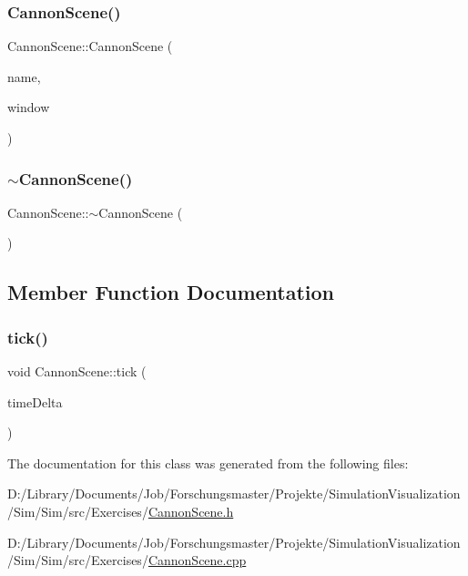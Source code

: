 \subsubsection{\texorpdfstring{Cannon\+Scene()}{CannonScene()}}
{\footnotesize\ttfamily Cannon\+Scene\+::\+Cannon\+Scene (\begin{DoxyParamCaption}\item[{const std\+::string \&}]{name,  }\item[{\mbox{\hyperlink{class_simulation_window}{Simulation\+Window}} $\ast$}]{window }\end{DoxyParamCaption})\hspace{0.3cm}{\ttfamily [explicit]}}

\mbox{\label{class_cannon_scene_af164426b8fb11e4910f53a2517fc9115}} 
\subsubsection{\texorpdfstring{$\sim$\+Cannon\+Scene()}{~CannonScene()}}
{\footnotesize\ttfamily Cannon\+Scene\+::$\sim$\+Cannon\+Scene (\begin{DoxyParamCaption}{ }\end{DoxyParamCaption})\hspace{0.3cm}{\ttfamily [default]}}



\subsection{Member Function Documentation}
\mbox{\label{class_cannon_scene_a2da031c5f2d38611f07985c6cbc91869}} 
\subsubsection{\texorpdfstring{tick()}{tick()}}
{\footnotesize\ttfamily void Cannon\+Scene\+::tick (\begin{DoxyParamCaption}\item[{float}]{time\+Delta }\end{DoxyParamCaption})\hspace{0.3cm}{\ttfamily [override]}}



The documentation for this class was generated from the following files\+:\begin{DoxyCompactItemize}
\item 
D\+:/\+Library/\+Documents/\+Job/\+Forschungsmaster/\+Projekte/\+Simulation\+Visualization/\+Sim/\+Sim/src/\+Exercises/\mbox{\hyperlink{_cannon_scene_8h}{Cannon\+Scene.\+h}}\item 
D\+:/\+Library/\+Documents/\+Job/\+Forschungsmaster/\+Projekte/\+Simulation\+Visualization/\+Sim/\+Sim/src/\+Exercises/\mbox{\hyperlink{_cannon_scene_8cpp}{Cannon\+Scene.\+cpp}}\end{DoxyCompactItemize}
